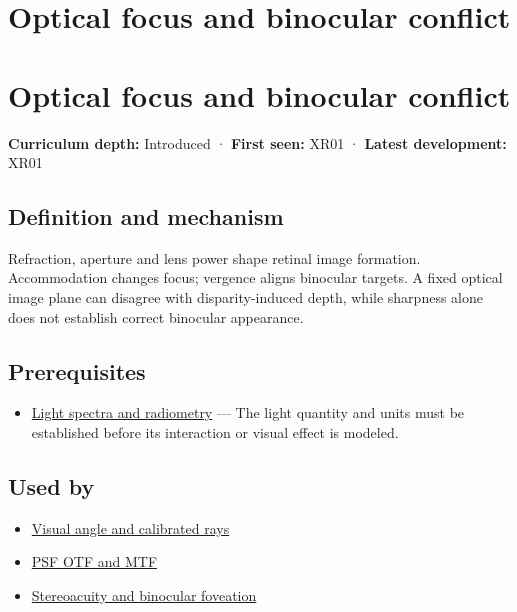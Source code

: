 \hypertarget{appendix-f90cee1be7a4}{}
\section*{Optical focus and binocular conflict}
\section{Optical focus and binocular conflict}\label{optical-focus-and-binocular-conflict}

\textbf{Curriculum depth:} Introduced · \textbf{First seen:} XR01 · \textbf{Latest development:} XR01

\subsection{Definition and mechanism}\label{definition-and-mechanism}

Refraction, aperture and lens power shape retinal image formation. Accommodation changes focus; vergence aligns binocular targets. A fixed optical image plane can disagree with disparity-induced depth, while sharpness alone does not establish correct binocular appearance.

\subsection{Prerequisites}\label{prerequisites}

\begin{itemize}
\tightlist
\item
  \hyperref[appendix-215c2570199b]{Light spectra and radiometry} --- The light quantity and units must be established before its interaction or visual effect is modeled.
\end{itemize}

\subsection{Used by}\label{used-by}

\begin{itemize}
\tightlist
\item
  \hyperref[appendix-7d356c396d1a]{Visual angle and calibrated rays}
\item
  \hyperref[appendix-8b76b0efd27f]{PSF OTF and MTF}
\item
  \hyperref[appendix-8dc848f14052]{Stereoacuity and binocular foveation}
\end{itemize}

